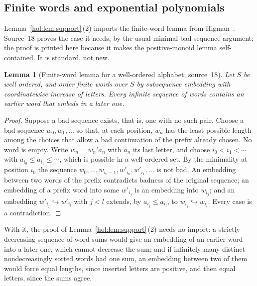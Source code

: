 \documentclass[11pt]{article}
\numberwithin{equation}{section}
\newtheorem{lemma}[theorem]{Lemma}
\theoremstyle{definition}
\theoremstyle{remark}
\begin{document}
\subsection{Finite words and exponential polynomials}
\label{hol:ud:sub:sml}

Lemma~\ref{hol:lem:support}\,(2) imports the finite-word lemma from
Higman~\cite{higman}. Source~18 proves the case it needs, by the usual
minimal-bad-sequence argument; the proof is printed here because it makes the
positive-monoid lemma self-contained. It is standard, not new.

\begin{lemma}[Finite-word lemma for a well-ordered alphabet; source~18]
\label{hol:ud:lem:words}
Let $S$ be well ordered, and order finite words over $S$ by subsequence
embedding with coordinatewise increase of letters. Every infinite sequence of
words contains an earlier word that embeds in a later one.
\end{lemma}

\begin{proof}
Suppose a bad sequence exists, that is, one with no such pair. Choose a bad
sequence $w_0,w_1,\ldots$ so that, at each position, $w_n$ has the least
possible length among the choices that allow a bad continuation of the prefix
already chosen. No word is empty. Write $w_n=w_n'a_n$ with $a_n$ its last
letter, and choose $i_0<i_1<\cdots$ with $a_{i_0}\le a_{i_1}\le\cdots$, which
is possible in a well-ordered set. By the minimality at position $i_0$ the
sequence $w_0,\ldots,w_{i_0-1},w'_{i_0},w'_{i_1},\ldots$ is not bad. An
embedding between two words of the prefix contradicts badness of the original
sequence; an embedding of a prefix word into some $w'_{i_j}$ is an embedding
into $w_{i_j}$; and an embedding $w'_{i_j}\hookrightarrow w'_{i_l}$ with $j<l$
extends, by $a_{i_j}\le a_{i_l}$, to $w_{i_j}\hookrightarrow w_{i_l}$. Every
case is a contradiction.
\end{proof}

With it, the proof of Lemma~\ref{hol:lem:support}\,(2) needs no import: a
strictly decreasing sequence of word sums would give an embedding of an
earlier word into a later one, which cannot decrease the sum; and if
infinitely many distinct nondecreasingly sorted words had one sum, an
embedding between two of them would force equal lengths, since inserted
letters are positive, and then equal letters, since the sums agree.
\end{document}
